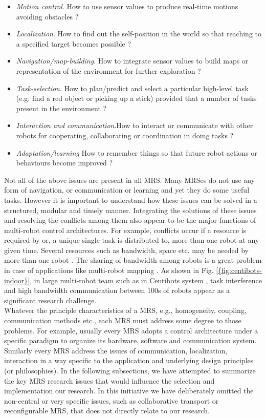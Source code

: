 \begin{itemize}
\item {\em Motion control}. How to use sensor values to produce real-time motions avoiding obstacles ?
\item {\em Localization}. How to find out the self-position in the world so that reaching to a specified target becomes possible ?
\item {\em Navigation/map-building}. How to integrate sensor values to build maps or representation of the environment for further exploration ?
\item {\em Task-selection}. How to plan/predict and select a particular high-level task (e.g. find a red object or picking up a stick) provided that a number of tasks present in the environment ? 
\item {\em Interaction and communication}.How to interact or communicate with other robots for cooperating, collaborating or coordination in doing tasks ?
\item {\em Adaptation/learning} How to remember things so that future robot actions or behaviours become improved ?
\end{itemize}
Not all of the above issues are present in all MRS. Many MRSes do not use any form of navigation, or communication or learning and yet they do some useful tasks. However it is important to understand how these issues can be solved in a structured, modular and timely manner. Integrating the solutions of these issues and resolving the conflicts among them also appear to be the major functions of multi-robot control architectures. For example, conflicts occur if a resource is required by or, a unique single task is distributed to, more than one robot at any given time. Several resources such as bandwidth, space etc. may be needed by more than one robot \cite{Cao+1997}. The sharing of bandwidth among robots is a great problem in case of applications like multi-robot mapping \cite{Konolige+2003}. As shown in Fig. \ref{{fig:centibots-indoor}}, in large multi-robot team such as in Centibots system \cite{Ortiz+2005}, task interference and high bandwidth communication between 100s of robots appear as a significant research challenge.\\
Whatever the principle characteristics of a MRS, e.g., homogeneity, coupling, communication methods etc., each MRS must address some degree to those problems. For example, usually every MRS adopts a control architecture under a specific paradigm to organize its hardware, software and communication system. Similarly every MRS address the issues of communication, localization, interaction in a way specific to the application and underlying design principles (or philosophies). In the following subsections, we have attempted to summarize the key MRS research issues that would influence the selection and implementation our research. In this initiative we have deliberately omitted the non-central or very specific issues, such as collaborative transport or reconfigurable MRS, that does not directly relate to our research.
